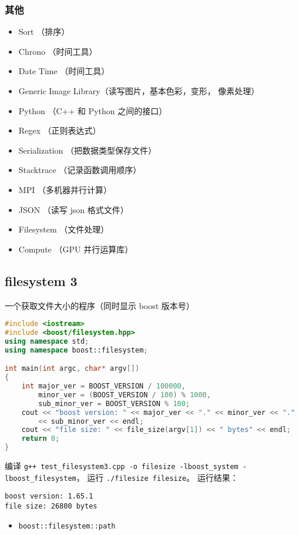 \subsubsection{其他}
\begin{itemize}
\item Sort （排序）
\item Chrono （时间工具）
\item Date Time （时间工具）
\item Generic Image Library（读写图片，基本色彩，变形， 像素处理）
\item Python （C++ 和 Python 之间的接口）
\item Regex （正则表达式）
\item Serialization （把数据类型保存文件）
\item Stacktrace （记录函数调用顺序）
\item MPI （多机器并行计算）
\item JSON （读写 json 格式文件）
\item Filesystem （文件处理）
\item Compute （GPU 并行运算库）
\end{itemize}


\subsection{filesystem 3}
一个获取文件大小的程序（同时显示 boost 版本号）
\begin{lstlisting}[language=cpp, caption=test\_filesystem3.cpp]
#include <iostream>
#include <boost/filesystem.hpp>
using namespace std;
using namespace boost::filesystem;

int main(int argc, char* argv[])
{
	int major_ver = BOOST_VERSION / 100000,
        minor_ver = (BOOST_VERSION / 100) % 1000,
		sub_minor_ver = BOOST_VERSION % 100;
	cout << "boost version: " << major_ver << "." << minor_ver << "."
        << sub_minor_ver << endl;
	cout << "file size: " << file_size(argv[1]) << " bytes" << endl;
	return 0;
}
\end{lstlisting}

编译 \verb|g++ test_filesystem3.cpp -o filesize -lboost_system -lboost_filesystem|， 运行 \verb|./filesize filesize|。 运行结果：
\begin{lstlisting}[language=none]
boost version: 1.65.1
file size: 26800 bytes
\end{lstlisting}

\begin{itemize}
\item \verb|boost::filesystem::path|
\end{itemize}
